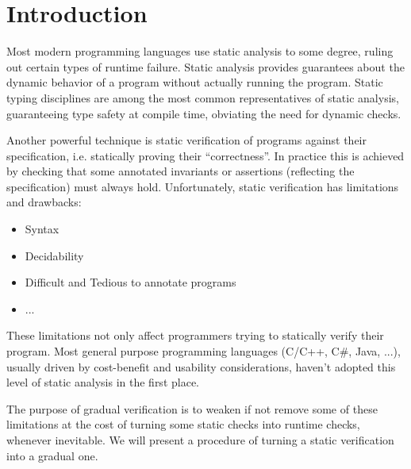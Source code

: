 
\chapter{Introduction}
Most modern programming languages use static analysis to some degree, ruling out certain types of runtime failure.
Static analysis provides guarantees about the dynamic behavior of a program without actually running the program.
Static typing disciplines are among the most common representatives of static analysis, guaranteeing type safety at compile time, obviating the need for dynamic checks.

Another powerful technique is static verification of programs against their specification, i.e. statically proving their “correctness”.
In practice this is achieved by checking that some annotated invariants or assertions (reflecting the specification) must always hold.
Unfortunately, static verification has limitations and drawbacks:
\begin{itemize} %
    \item Syntax
    \item Decidability
    \item Difficult and Tedious to annotate programs
    \item ...
\end{itemize}
These limitations not only affect programmers trying to statically verify their program.
Most general purpose programming languages (C/C++, C\#, Java, ...), usually driven by cost-benefit and usability considerations, haven't adopted this level of static analysis in the first place.

The purpose of gradual verification is to weaken if not remove some of these limitations at the cost of turning some static checks into runtime checks, whenever inevitable.
We will present a procedure of turning a static verification into a gradual one.

